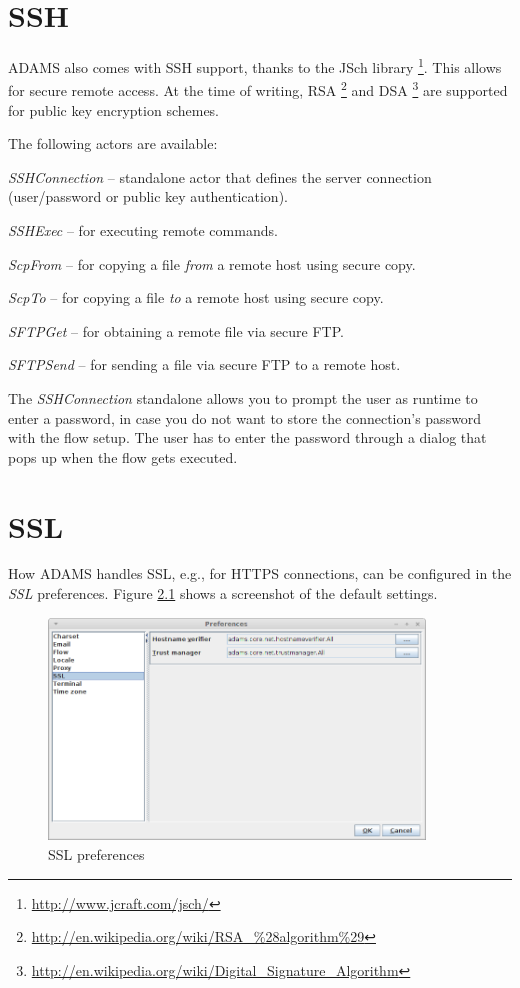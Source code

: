 \documentclass[a4paper]{book}
\begin{document}
\chapter{SSH}
ADAMS also comes with SSH support, thanks to the JSch library
\footnote{\url{http://www.jcraft.com/jsch/}{}}. This allows for secure remote
access. At the time of writing, RSA
\footnote{\url{http://en.wikipedia.org/wiki/RSA_\%28algorithm\%29}{}} and DSA
\footnote{\url{http://en.wikipedia.org/wiki/Digital_Signature_Algorithm}{}} are
supported for public key encryption schemes.

The following actors are available:
\begin{tight_itemize}
	\item \textit{SSHConnection} -- standalone actor that defines the server
	connection (user/password or public key authentication).
	\item \textit{SSHExec} -- for executing remote commands.
	\item \textit{ScpFrom} -- for copying a file \textit{from} a remote host using
	secure copy.
	\item \textit{ScpTo} -- for copying a file \textit{to} a remote host using
	secure copy.
	\item \textit{SFTPGet} -- for obtaining a remote file via secure FTP.
	\item \textit{SFTPSend} -- for sending a file via secure FTP to a remote host.
\end{tight_itemize}
The \textit{SSHConnection} standalone allows you to prompt the user as runtime
to enter a password, in case you do not want to store the connection's password
with the flow setup. The user has to enter the password through a dialog that
pops up when the flow gets executed.

\chapter{SSL}
How ADAMS handles SSL, e.g., for HTTPS connections, can be configured in the
\textit{SSL} preferences. Figure \ref{ssl_setup} shows a screenshot of the
default settings.

\begin{figure}[htb]
  \centering
  \includegraphics[width=10.0cm]{images/ssl_setup.png}
  \caption{SSL preferences}
  \label{ssl_setup}
\end{figure}
\end{document}
